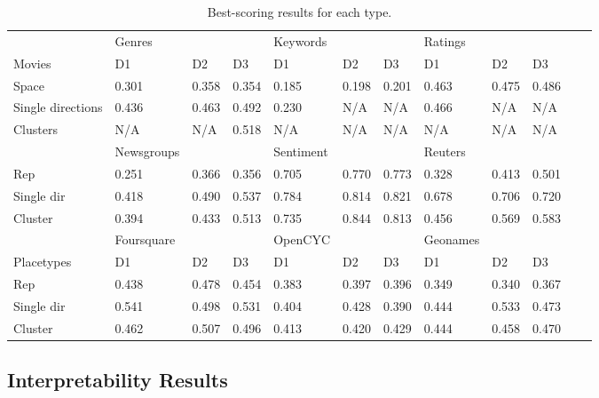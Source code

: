 \begin{landscape}
\begin{table}[]
	\begin{tabular}{llllllllllll}
                  & Genres     &       &       & Keywords  &       &       & Ratings  &       &       &  &  \\
Movies            & D1         & D2    & D3    & D1        & D2    & D3    & D1       & D2    & D3    &  &  \\
Space             & 0.301      & 0.358 & 0.354 & 0.185     & 0.198 & 0.201 & 0.463    & 0.475 & 0.486 &  &  \\
Single directions & 0.436      & 0.463 & 0.492 & 0.230     & N/A   & N/A   & 0.466    & N/A   & N/A   &  &  \\
Clusters          & N/A        & N/A   & 0.518 & N/A       & N/A   & N/A   & N/A      & N/A   & N/A   &  &  \\
& Newsgroups &       &       & Sentiment &       &       & Reuters  &       &       &  &  \\
Rep               & 0.251      & 0.366 & 0.356 & 0.705     & 0.770 & 0.773 & 0.328    & 0.413 & 0.501 &  &  \\
Single dir        & 0.418      & 0.490 & 0.537 & 0.784     & 0.814 & 0.821 & 0.678    & 0.706 & 0.720 &  &  \\
Cluster           & 0.394      & 0.433 & 0.513 & 0.735     & 0.844 & 0.813 & 0.456    & 0.569 & 0.583 &  &  \\
& Foursquare &       &       & OpenCYC   &       &       & Geonames &       &       &  &  \\
Placetypes        & D1         & D2    & D3    & D1        & D2    & D3    & D1       & D2    & D3    &  &  \\
Rep               & 0.438      & 0.478 & 0.454 & 0.383     & 0.397 & 0.396 & 0.349    & 0.340 & 0.367 &  &  \\
Single dir        & 0.541      & 0.498 & 0.531 & 0.404     & 0.428 & 0.390 & 0.444    & 0.533 & 0.473 &  &  \\
Cluster           & 0.462      & 0.507 & 0.496 & 0.413     & 0.420 & 0.429 & 0.444    & 0.458 & 0.470 &  &  \\
	\end{tabular}\caption{Best-scoring results for each type.}
\end{table}
\end{landscape}




\subsection{Interpretability Results}
